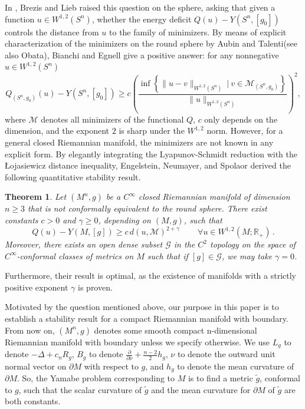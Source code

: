 \documentclass[12pt]{amsart}
\newtheorem{theorem}{Theorem}[section]
\newcommand{\R}{{\mathbb{R}}}
\newcommand{\g}{{\gamma}}
\begin{document}
   In \cite{BL85}, Brezis and Lieb raised this question on the sphere, asking that given a function $u \in W^{1,2}(S^n)$, whether the energy deficit $Q(u)- Y(S^n,[g_0])$ controls the distance from $u$ to the family of minimizers. By means of explicit characterization of the minimizers on the round sphere by Aubin\cite{Au76b} and Talenti\cite{Ta76}(see also Obata\cite{Ob71}), Bianchi and Egnell give a positive answer: for any nonnegative $u \in W^{1,2}(S^n)$
   \begin{equation}\label{eqn: BE}
   Q_{(S^n,g_0)}(u) -Y(S^n, [g_0]) \geq c  \left(\frac{\inf \left\{ \| u-v\|_{W^{1,2}(S^n)}\ | \  {v \in \mathcal{M}_{(S^n,g_0)}} \right\}}{\| u \|_{W^{1,2}(S^n )} }\right)^2,
   \end{equation}
   where $\mathcal{M}$ denotes all minimizers of the functional $Q$, $c$ only depends on the dimension, and the exponent $2$ is sharp under the 
   $W^{1,2}$ norm. However, for a general closed Riemannian manifold, the minimizers are not known in any explicit form. By elegantly integrating the Lyapunov-Schmidt reduction with the \L ojasiewicz distance inequality, Engelstein, Neumayer, and Spolaor\cite{ENL22} derived the following quantitative stability result.
    \begin{theorem}\cite{ENL22} \label{ENL22}
 	Let $(M^n,g)$ be a $C^\infty$ closed Riemannian manifold of dimension $n\geq 3$ that is not conformally equivalent to the round sphere. There exist constants $c>0$ and  $\g\ge 0 $, depending on $(M,g)$, such that 
 	\begin{equation}
 	Q(u) - Y(M,[g]) \geq c\, d(u, \mathcal{M})^{2+\g}\, \qquad \forall u \in W^{1,2}(M;\R_+)  \,.
 	\end{equation}
 	Moreover, there exists an open dense subset $\mathcal G$ in the $C^2$ topology on the space of $C^\infty$-conformal classes of metrics on $M$ such that if $[g] \in \mathcal G$, we may take $\g=0$.
   \end{theorem}
   Furthermore, their result is optimal, as the existence of manifolds with a strictly positive exponent $\gamma$ is proven.
   
   Motivated by the question mentioned above, our purpose in this paper is to establish a stability result for a compact Riemannian manifold with boundary.
   From now on, $(M^n,g)$ denotes some smooth compact n-dimensional Riemannian manifold with boundary unless we specify otherwise. We use $L_g$ to denote $- \Delta + c_nR_g$, $B_g$
   to denote $\frac{\partial}{\partial \nu} +\frac{n-2}{2}h_g$, $\nu$ to denote the outward unit normal vector on $\partial M$ with respect to $g$, and $h_g$ to denote the mean curvature of $\partial M$. 
   So, the Yamabe problem corresponding to $M$ is to find a metric  $\tilde{g}$, conformal to $g$, such that the scalar curvature of $\tilde{g}$  and the mean curvature for $\partial M$ of $\tilde{g}$  are both constants.
   \\
\end{document}
